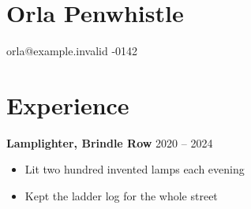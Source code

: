 \documentclass[11pt]{article}
\begin{document}
\section*{Orla Penwhistle}
orla@example.invalid -0142
\section*{Experience}
\textbf{Lamplighter, Brindle Row} \hfill 2020 -- 2024
\begin{itemize}
  \item Lit two hundred invented lamps each evening
  \item Kept the ladder log for the whole street
\end{itemize}
\end{document}
